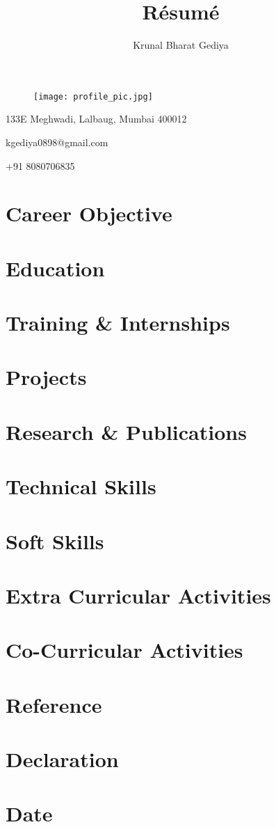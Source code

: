 \documentclass[11pt]{article}
\begin{document}
\title{R\'esum\'e}

\author{Krunal Bharat Gediya}

\maketitle
\begin{figure}[H]
    \centering
    \texttt{[image: profile\_pic.jpg]}
\end{figure}
\begin{center}
    133E Meghwadi, Lalbaug, Mumbai 400012

    kgediya0898@gmail.com
    
    +91 8080706835 
\end{center}

\section{Career Objective}
\section{Education}
\section{Training \& Internships}
\section{Projects}
\section{Research \& Publications}
\section{Technical Skills}
\section{Soft Skills}
\section{Extra Curricular Activities}
\section{Co-Curricular Activities}
\section{Reference}
\section{Declaration}
\section{Date}
\end{document}
